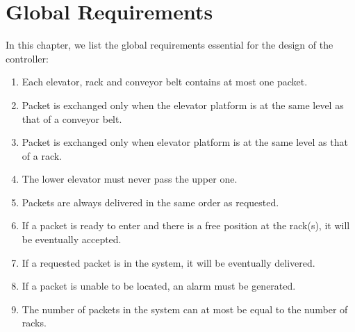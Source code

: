 \section*{Global Requirements}
\label{sec:global_req}
In this chapter, we list the global requirements essential for the design of the controller:
\begin{enumerate}
\item Each elevator, rack and conveyor belt contains at most one packet.
\item Packet is exchanged only when the elevator platform is at the same level as that of a conveyor belt.
\item Packet is exchanged only when elevator platform is at the same level as that of a rack.
\item The lower elevator must never pass the upper one.
\item Packets are always delivered in the same order as requested.
\item If a packet is ready to enter and there is a free position at the rack(s), it will be eventually accepted.
\item If a requested packet is in the system, it will be eventually delivered. %
\item If a packet is unable to be located, an alarm must be generated.
\item The number of packets in the system can at most be equal to the number of racks.
 



\end{enumerate}
